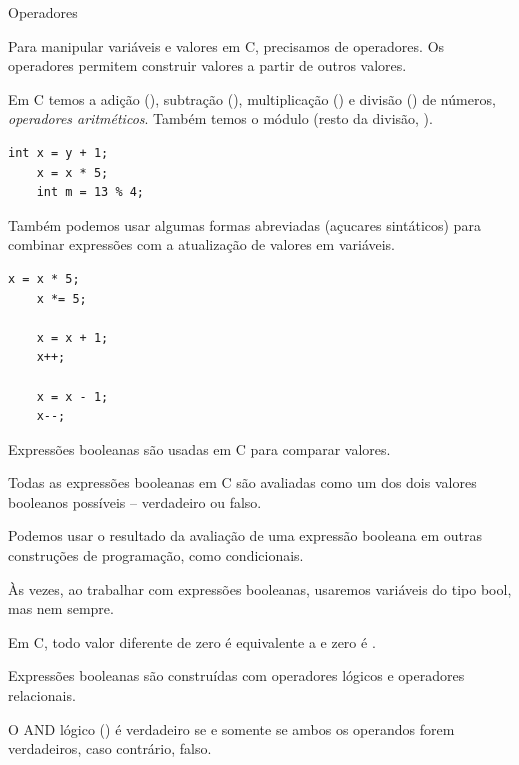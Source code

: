 \documentclass{beamer}
\begin{document}
\begin{frame}{Operadores}

  Para manipular variáveis e valores em C, precisamos de
  operadores. Os operadores permitem construir valores a partir de
  outros valores.

  Em C temos a adição (\ilcode{+}), subtração (\ilcode{-}),
  multiplicação (\ilcode{*}) e divisão (\ilcode{/}) de números,
  \emph{operadores aritméticos}. Também temos o módulo (resto da
  divisão, \ilcode{\%}). \vspace{.5cm}

  \begin{lstlisting}[style=normalc]
    int x = y + 1;
    x = x * 5;
    int m = 13 % 4;
  \end{lstlisting}

  \framebreak

  Também podemos usar algumas formas abreviadas (açucares sintáticos)
  para combinar expressões com a atualização de valores em variáveis.\vspace{.5cm}

  \begin{lstlisting}[style=normalc]
    x = x * 5;
    x *= 5;

    x = x + 1;
    x++;
    
    x = x - 1;
    x--;
  \end{lstlisting}

  \framebreak

  Expressões booleanas são usadas em C para comparar valores.
  
  Todas as expressões booleanas em C são avaliadas como um dos dois
  valores booleanos possíveis – verdadeiro ou falso.
  
  Podemos usar o resultado da avaliação de uma expressão booleana em
  outras construções de programação, como condicionais.

  \framebreak

  Às vezes, ao trabalhar com expressões booleanas, usaremos variáveis
  do tipo bool, mas nem sempre.
  
  Em C, todo valor diferente de zero é equivalente a  e
  zero é .

  Expressões booleanas são construídas com operadores lógicos e
  operadores relacionais.

  \framebreak

  O AND lógico (\ilcode{\&\&}) é verdadeiro se e somente se ambos os
  operandos forem verdadeiros, caso contrário, falso.


\end{frame}
\end{document}
